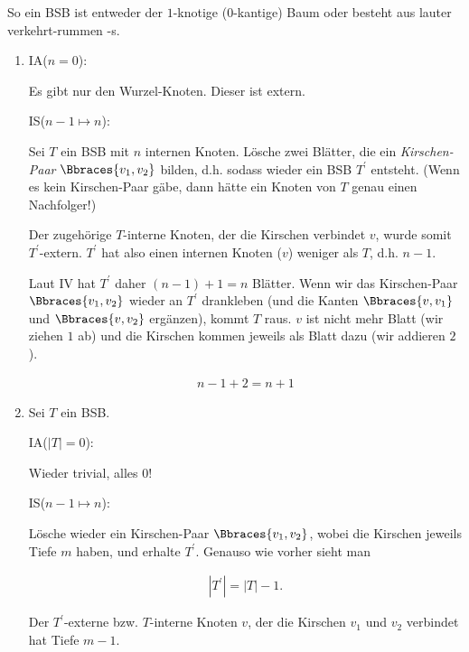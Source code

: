 \begin{solution}

So ein BSB ist entweder der $1$-knotige ($0$-kantige) Baum oder besteht aus lauter verkehrt-rummen -s.

\begin{enumerate}[label = \alph*]

    \item IA($n = 0$):
    
    Es gibt nur den Wurzel-Knoten.
    Dieser ist extern.

    IS($n-1 \mapsto n$):

    Sei $T$ ein BSB mit $n$ internen Knoten.
    Lösche zwei Blätter, die ein \textit{Kirschen-Paar} $\Bbraces{v_1, v_2}$ bilden, d.h. sodass wieder ein BSB $T^\prime$ entsteht.
    (Wenn es kein Kirschen-Paar gäbe, dann hätte ein Knoten von $T$ genau einen Nachfolger!)

    Der zugehörige $T$-interne Knoten, der die Kirschen verbindet $v$, wurde somit $T^\prime$-extern.
    $T^\prime$ hat also einen internen Knoten ($v$) weniger als $T$, d.h. $n - 1$.

    Laut IV hat $T^\prime$ daher $(n - 1) + 1 = n$ Blätter.
    Wenn wir das Kirschen-Paar $\Bbraces{v_1, v_2}$ wieder an $T^\prime$ drankleben (und die Kanten $\Bbraces{v, v_1}$ und $\Bbraces{v, v_2}$ ergänzen), kommt $T$ raus.
    $v$ ist nicht mehr Blatt (wir ziehen $1$ ab) und die Kirschen kommen jeweils als Blatt dazu (wir addieren $2$).

    \begin{align*}
        n - 1 + 2 = n + 1
    \end{align*}

    \item Sei $T$ ein BSB.    

    IA($|T| = 0$):
    
    Wieder trivial, alles $0$!

    IS($n-1 \mapsto n$):

    Lösche wieder ein Kirschen-Paar $\Bbraces{v_1, v_2}$, wobei die Kirschen jeweils Tiefe $m$ haben, und erhalte $T^\prime$.
    Genauso wie vorher sieht man

    \begin{align*}
        |T^\prime| = |T| - 1.
    \end{align*}

    Der $T^\prime$-externe bzw. $T$-interne Knoten $v$, der die Kirschen $v_1$ und $v_2$ verbindet hat Tiefe $m - 1$.


\end{enumerate}
\end{solution}
